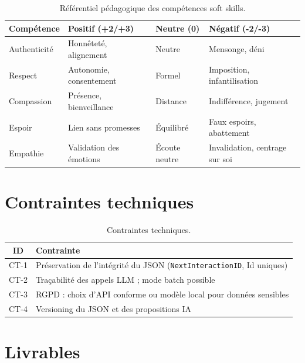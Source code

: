 \begin{table}[!htbp]
\centering
\small
\begin{tabular}{l l l l}
\toprule
\textbf{Comp\'etence} & \textbf{Positif (+2/+3)} & \textbf{Neutre (0)} & \textbf{N\'egatif (-2/-3)} \\
\midrule
Authenticit\'e & Honn\^etet\'e, alignement & Neutre & Mensonge, d\'eni \\
Respect & Autonomie, consentement & Formel & Imposition, infantilisation \\
Compassion & Pr\'esence, bienveillance & Distance & Indiff\'erence, jugement \\
Espoir & Lien sans promesses & \'Equilibr\'e & Faux espoirs, abattement \\
Empathie & Validation des \'emotions & \'Ecoute neutre & Invalidation, centrage sur soi \\
\bottomrule
\end{tabular}
\caption{R\'ef\'erentiel p\'edagogique des comp\'etences soft skills.}
\end{table}

\section{Contraintes techniques}

\begin{table}[!htbp]
\centering
\begin{tabular}{c p{12cm}}
\toprule
\textbf{ID} & \textbf{Contrainte} \\
\midrule
CT-1 & Pr\'eservation de l'int\'egrit\'e du JSON (\texttt{NextInteractionID}, Id uniques) \\
CT-2 & Tra\c{c}abilit\'e des appels LLM ; mode batch possible \\
CT-3 & RGPD : choix d'API conforme ou mod\`ele local pour donn\'ees sensibles \\
CT-4 & Versioning du JSON et des propositions IA \\
\bottomrule
\end{tabular}
\caption{Contraintes techniques.}
\end{table}

\section{Livrables}

